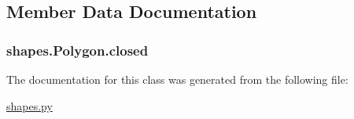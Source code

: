 \subsection{Member Data Documentation}
\hypertarget{classshapes_1_1_polygon_a941c41ed1047fbba7fd5fbffa67683b4}{}
\subsubsection[{closed}]{\setlength{\rightskip}{0pt plus 5cm}shapes.\+Polygon.\+closed}\label{classshapes_1_1_polygon_a941c41ed1047fbba7fd5fbffa67683b4}


The documentation for this class was generated from the following file\+:\begin{DoxyCompactItemize}
\item 
\hyperlink{shapes_8py}{shapes.\+py}\end{DoxyCompactItemize}
